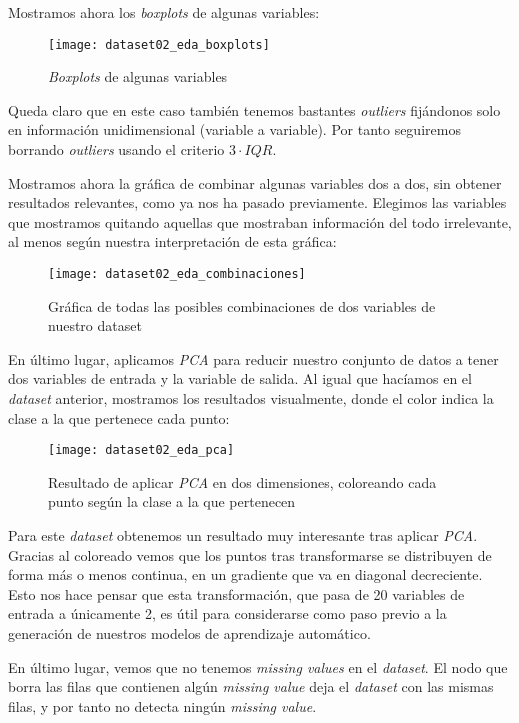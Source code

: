 \documentclass[11pt]{article}
\begin{document}
Mostramos ahora los \emph{boxplots} de algunas variables:

\begin{figure}[H]
    \centering
    \texttt{[image: dataset02\_eda\_boxplots]}
    \caption{\emph{Boxplots} de algunas variables}
\end{figure}

Queda claro que en este caso también tenemos bastantes \emph{outliers} fijándonos solo en información unidimensional (variable a variable). Por tanto seguiremos borrando \emph{outliers} usando el criterio $3\cdot IQR$.

Mostramos ahora la gráfica de combinar algunas variables dos a dos, sin obtener resultados relevantes, como ya nos ha pasado previamente. Elegimos las variables que mostramos quitando aquellas que mostraban información del todo irrelevante, al menos según nuestra interpretación de esta gráfica:

\begin{figure}[H]
    \centering
    \texttt{[image: dataset02\_eda\_combinaciones]}
    \caption{Gráfica de todas las posibles combinaciones de dos variables de nuestro dataset}
\end{figure}

En último lugar, aplicamos \emph{PCA} para reducir nuestro conjunto de datos a tener dos variables de entrada y la variable de salida. Al igual que hacíamos en el \emph{dataset} anterior, mostramos los resultados visualmente, donde el color indica la clase a la que pertenece cada punto:

\begin{figure}[H]
    \centering
    \texttt{[image: dataset02\_eda\_pca]}
    \caption{Resultado de aplicar \emph{PCA} en dos dimensiones, coloreando cada punto según la clase
a la que pertenecen}
\end{figure}

Para este \emph{dataset} obtenemos un resultado muy interesante tras aplicar \emph{PCA}. Gracias al coloreado vemos que los puntos tras transformarse se distribuyen de forma más o menos continua, en un gradiente que va en diagonal decreciente. Esto nos hace pensar que esta transformación, que pasa de 20 variables de entrada a únicamente 2, es útil para considerarse como paso previo a la generación de nuestros modelos de aprendizaje automático.

En último lugar, vemos que no tenemos \emph{missing values} en el \emph{dataset}. El nodo que borra las filas que contienen algún \emph{missing value} deja el \emph{dataset} con las mismas filas, y por tanto no detecta ningún \emph{missing value}.
\end{document}

